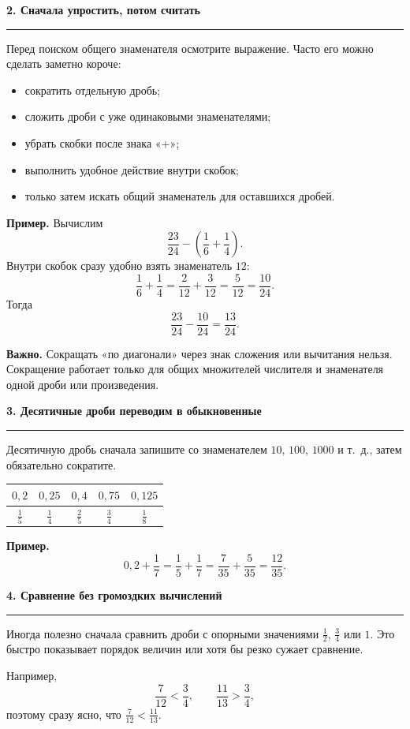 \documentclass[a4paper,12pt]{article}
\newcommand{\sectiontitle}[1]{%
  \vspace{0.7em}
  {\large\bfseries\color{darkaccent}#1}\par
  \vspace{0.2em}\color{linegray}\hrule\color{textgray}\vspace{0.55em}
}
\newcommand{\warning}[1]{\textbf{Важно.} #1}
\newcommand{\ex}[1]{\textbf{Пример.} #1}
\begin{document}
\sectiontitle{2. Сначала упростить, потом считать}

Перед поиском общего знаменателя осмотрите выражение. Часто его можно сделать заметно короче:
\begin{itemize}
  \item сократить отдельную дробь;
  \item сложить дроби с уже одинаковыми знаменателями;
  \item убрать скобки после знака «+»;
  \item выполнить удобное действие внутри скобок;
  \item только затем искать общий знаменатель для оставшихся дробей.
\end{itemize}

\ex{Вычислим}
\[
\frac{23}{24}-\left(\frac16+\frac14\right).
\]
Внутри скобок сразу удобно взять знаменатель \(12\):
\[
\frac16+\frac14=\frac2{12}+\frac3{12}=\frac5{12}=\frac{10}{24}.
\]
Тогда
\[
\frac{23}{24}-\frac{10}{24}=\boxed{\frac{13}{24}}.
\]

\warning{Сокращать «по диагонали» через знак сложения или вычитания нельзя. Сокращение работает только для общих множителей числителя и знаменателя одной дроби или произведения.}

\sectiontitle{3. Десятичные дроби переводим в обыкновенные}

Десятичную дробь сначала запишите со знаменателем \(10\), \(100\), \(1000\) и т.~д., затем обязательно сократите.

\begin{center}
\renewcommand{\arraystretch}{1.35}
\begin{tabular}{ccccc}
\toprule
\(0{,}2\) & \(0{,}25\) & \(0{,}4\) & \(0{,}75\) & \(0{,}125\) \\
\midrule
\(\frac15\) & \(\frac14\) & \(\frac25\) & \(\frac34\) & \(\frac18\) \\
\bottomrule
\end{tabular}
\end{center}

\ex{
\[
0{,}2+\frac17=\frac15+\frac17=\frac7{35}+\frac5{35}=\boxed{\frac{12}{35}}.
\]
}

\sectiontitle{4. Сравнение без громоздких вычислений}

Иногда полезно сначала сравнить дроби с опорными значениями \(\frac12\), \(\frac34\) или \(1\). Это быстро показывает порядок величин или хотя бы резко сужает сравнение.

Например,
\[
\frac7{12}<\frac34,\qquad
\frac{11}{13}>\frac34,
\]
поэтому сразу ясно, что \(\frac7{12}<\frac{11}{13}\).
\end{document}
